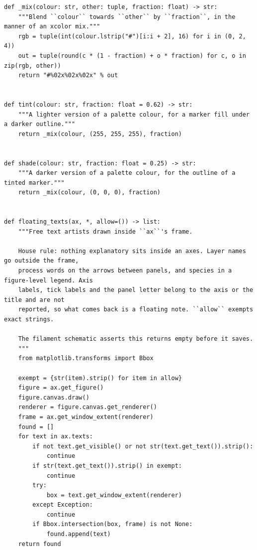 \documentclass[a4paper,10pt]{article}
\begin{document}
\begin{Verbatim}
def _mix(colour: str, other: tuple, fraction: float) -> str:
    """Blend ``colour`` towards ``other`` by ``fraction``, in the manner of an xcolor mix."""
    rgb = tuple(int(colour.lstrip("#")[i:i + 2], 16) for i in (0, 2, 4))
    out = tuple(round(c * (1 - fraction) + o * fraction) for c, o in zip(rgb, other))
    return "#%02x%02x%02x" % out


def tint(colour: str, fraction: float = 0.62) -> str:
    """A lighter version of a palette colour, for a marker fill under a darker outline."""
    return _mix(colour, (255, 255, 255), fraction)


def shade(colour: str, fraction: float = 0.25) -> str:
    """A darker version of a palette colour, for the outline of a tinted marker."""
    return _mix(colour, (0, 0, 0), fraction)


def floating_texts(ax, *, allow=()) -> list:
    """Free text artists drawn inside ``ax``'s frame.

    House rule: nothing explanatory sits inside an axes. Layer names go outside the frame,
    process words on the arrows between panels, and species in a figure-level legend. Axis
    labels, tick labels and the panel letter belong to the axis or the title and are not
    reported, so what comes back is a floating note. ``allow`` exempts exact strings.

    The filament schematic asserts this returns empty before it saves.
    """
    from matplotlib.transforms import Bbox

    exempt = {str(item).strip() for item in allow}
    figure = ax.get_figure()
    figure.canvas.draw()
    renderer = figure.canvas.get_renderer()
    frame = ax.get_window_extent(renderer)
    found = []
    for text in ax.texts:
        if not text.get_visible() or not str(text.get_text()).strip():
            continue
        if str(text.get_text()).strip() in exempt:
            continue
        try:
            box = text.get_window_extent(renderer)
        except Exception:
            continue
        if Bbox.intersection(box, frame) is not None:
            found.append(text)
    return found
\end{Verbatim}
\end{document}
